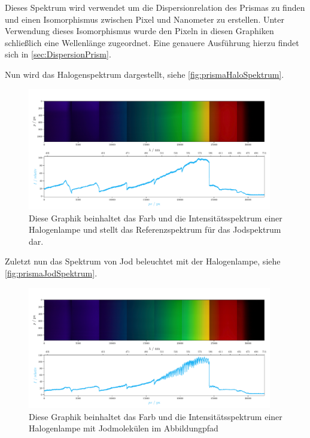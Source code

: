 \documentclass[12pt,english,ngerman]{scrartcl}
\begin{document}
Dieses Spektrum wird verwendet um die Dispersionrelation des Prismas zu finden
und einen Isomorphismus zwischen Pixel und Nanometer zu erstellen. Unter
Verwendung dieses Isomorphismus wurde den Pixeln in diesen Graphiken
schließlich eine Wellenlänge zugeordnet. Eine genauere Ausführung hierzu findet
sich in \autoref{sec:DispersionPrism}.

Nun wird das Halogenspektrum dargestellt, siehe
\autoref{fig:prismaHaloSpektrum}. 
\begin{figure}[H]
	\begin{center}
		\includegraphics[width=0.95\textwidth]{figures/Halo_plot.pdf}
	\end{center}
	\caption{
		Diese Graphik beinhaltet das Farb und die Intensitätsspektrum einer
		Halogenlampe und stellt das Referenzspektrum für das Jodspektrum dar. 
	}\label{fig:prismaHaloSpektrum}
\end{figure}

Zuletzt nun das Spektrum von Jod beleuchtet mit der Halogenlampe, siehe
\autoref{fig:prismaJodSpektrum}.

\begin{figure}[H]
	\begin{center}
		\includegraphics[width=0.95\textwidth]{figures/I_plot.pdf}
	\end{center}
	\caption{Diese Graphik beinhaltet das Farb und die Intensitätsspektrum einer
		Halogenlampe mit Jodmolekülen im Abbildungpfad
	}\label{fig:prismaJodSpektrum}
\end{figure}
\end{document}

